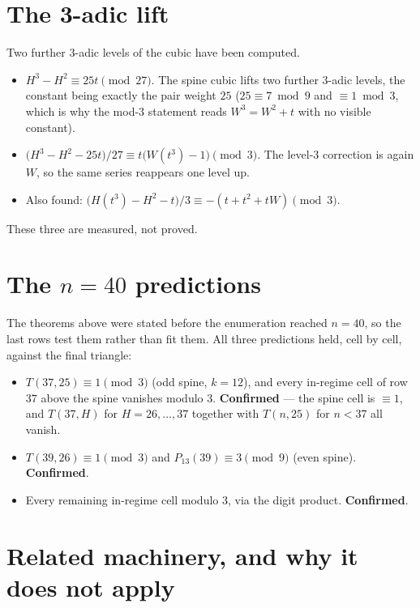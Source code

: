 \documentclass[11pt]{article}
\begin{document}
\section{The 3-adic lift}
\label{sec:lift}

Two further $3$-adic levels of the cubic have been computed.

\begin{itemize}
\item $H^3 - H^2 \equiv 25t \pmod{27}$. The spine cubic lifts two further
  $3$-adic levels, the constant being exactly the pair weight $25$
  ($25 \equiv 7 \bmod 9$ and $\equiv 1 \bmod 3$, which is why the mod-$3$
  statement reads $W^3 = W^2 + t$ with no visible constant).
\item $\bigl(H^3 - H^2 - 25t\bigr)/27 \equiv t\bigl(W(t^3)-1\bigr) \pmod 3$. The
  level-$3$ correction is again $W$, so the same series reappears one level up.
\item Also found: $\bigl(H(t^3) - H^2 - t\bigr)/3 \equiv -(t + t^2 + tW)
  \pmod 3$.
\end{itemize}

These three are measured, not proved.

\section{The \texorpdfstring{$n = 40$}{n = 40} predictions}

The theorems above were stated before the enumeration reached $n = 40$, so the
last rows test them rather than fit them. All three predictions held, cell by
cell, against the final triangle:

\begin{itemize}
\item $T(37,25) \equiv 1 \pmod 3$ (odd spine, $k=12$), and every in-regime cell
  of row $37$ above the spine vanishes modulo $3$. \textbf{Confirmed} --- the
  spine cell is $\equiv 1$, and $T(37,H)$ for $H = 26,\dots,37$ together with
  $T(n,25)$ for $n < 37$ all vanish.
\item $T(39,26) \equiv 1 \pmod 3$ and $P_{13}(39) \equiv 3 \pmod 9$ (even
  spine). \textbf{Confirmed}.
\item Every remaining in-regime cell modulo $3$, via the digit product.
  \textbf{Confirmed}.
\end{itemize}

\section{Related machinery, and why it does not apply}
\label{sec:related}
\end{document}

